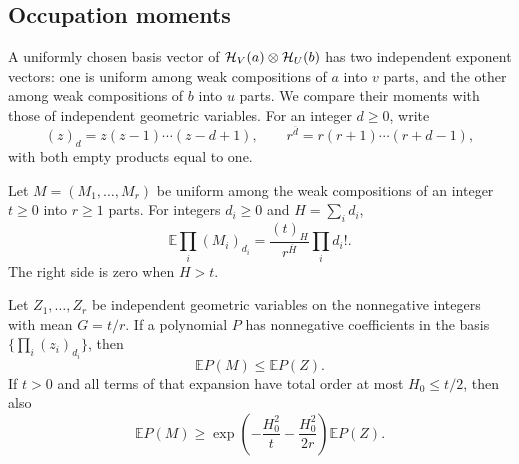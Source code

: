 \subsection{Occupation moments}

A uniformly chosen basis vector of $\mathcal H_V(a)\otimes\mathcal H_U(b)$ has two
independent exponent vectors: one is uniform among weak compositions
of $a$ into $v$ parts, and the other among weak compositions of $b$
into $u$ parts.  We compare their moments with those of independent
geometric variables.  For an integer $d\ge0$, write
\[
  (z)_d=z(z-1)\cdots(z-d+1),\qquad
  r^{\overline d}=r(r+1)\cdots(r+d-1),
\]
with both empty products equal to one.

\begin{lemma}
\label{lem:occupation-moments}
Let $M=(M_1,\ldots,M_r)$ be uniform among the weak compositions of an
integer $t\ge0$ into $r\ge1$ parts.  For integers $d_i\ge0$ and
$H=\sum_i d_i$,
\begin{equation}
  \mathbb E\prod_i(M_i)_{d_i}
   =\frac{(t)_H}{r^{\overline H}}\prod_i d_i!.
  \label{eq:composition-moment}
\end{equation}
The right side is zero when $H>t$.

Let $Z_1,\ldots,Z_r$ be independent geometric variables on the
nonnegative integers with mean $G=t/r$.  If a polynomial $P$ has
nonnegative coefficients in the basis
$\{\prod_i(z_i)_{d_i}\}$, then
\begin{equation}
  \mathbb E P(M)\le\mathbb E P(Z).
  \label{eq:occupation-upper}
\end{equation}
If $t>0$ and all terms of that expansion have total order at most
$H_0\le t/2$, then also
\begin{equation}
  \mathbb E P(M)
  \ge
  \exp\left(-\frac{H_0^2}{t}-\frac{H_0^2}{2r}\right)
  \mathbb E P(Z).
  \label{eq:occupation-lower}
\end{equation}
\end{lemma}

